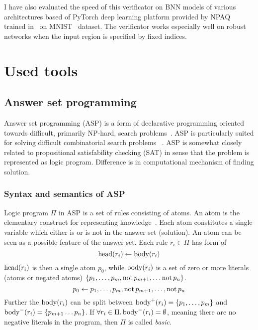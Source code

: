 \documentclass[
    digital,
    color,
    oneside,
    sansbold,
    lot,
    nolof
]{fithesis}
\begin{document}
I have also evaluated the speed of this verificator on BNN models of various
architectures based of PyTorch deep learning platform provided by NPAQ~\cite{baluta2019quantitative}
trained in~\cite{10.1145/3563212} on MNIST~\cite{mnist2017} dataset.
The verificator works especially well on robust networks when the input region
is specified by fixed indices.


\chapter{Used tools}

\section{Answer set programming}

Answer set programming (ASP) is a form of declarative
programming oriented towards difficult, primarily NP-hard,
search problems~\cite{lifschitz2008answer}.
ASP is particularly suited for solving difficult combinatorial search problems%
~\cite{anger2005glimpse}.
ASP is somewhat closely related to propositional
satisfability checking (SAT)
in sense that the problem is represented as logic program. Difference is in
computational mechanism of finding solution.

\subsection{Syntax and semantics of ASP}
Logic program $\Pi$ in ASP is a set of rules consisting of atoms.
An atom is the elementary construct for representing knowledge~\cite{Delgrande}.
Each atom constitutes a single variable which either is or is not in the answer
set (solution). An atom can be seen as a possible feature of the answer set.
Each rule $r_i\in \Pi$ has form of
\begin{equation}
    \mathrm{head}(r_i) \leftarrow{} \mathrm{body}(r_i)
\end{equation}
$\mathrm{head}(r_i)$ is then a single atom $p_0$, while $\mathrm{body}(r_i)$ is a set of zero
or more literals (atoms or negated atoms)
$\{p_1, \dots, p_m, \mathrm{not}\, p_{m+1}, \dots \mathrm{not}\, p_n\}$.
\begin{equation}
    p_0 \leftarrow{} p_1, \dots, p_m, \mathrm{not}\, p_{m+1}, \dots, \mathrm{not}\, p_n
\end{equation}
Further the $\mathrm{body}(r_i)$ can be split between
$\mathrm{body}^+(r_i) = \{p_1, \dots, p_m\}$
and $\mathrm{body}^-(r_i) = \{p_{m+1}\dots p_n\}$.
If $\forall r_i \in \Pi.\, \mathrm{body}^-(r_i) = \emptyset$, meaning there are no
negative literals in the program, then $\Pi$
is called \textit{basic}.
\end{document}
